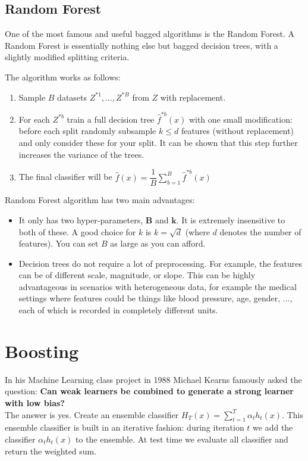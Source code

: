 \documentclass[twoside]{article}
\begin{document}
\subsection{Random Forest}

One of the most famous and useful bagged algorithms is the Random Forest. A Random Forest is essentially nothing else but bagged decision trees, with a slightly modified splitting criteria.

The algorithm works as follows:

\begin{enumerate}
    \item Sample $B$ datasets $Z^{*1},\ldots,Z^{*B}$  from $Z$ with replacement.
    \item For each $Z^{*b}$ train a full decision tree $\hat{f}^{*b}(x)$ with one small modification: before each split randomly subsample $k \leq d$ features (without replacement) and only consider these for your split.
    It can be shown that this step further increases the variance of the trees.
    \item The final classifier will be $\hat{f}(x) = \dfrac{1}{B} \sum_{b=1}^{B}\hat{f}^{*b}(x)$
\end{enumerate}

Random Forest algorithm has two main advantages:

\begin{itemize}
    \item It only has two hyper-parameters, $\mathbf{B}$ and $\mathbf{k}$. It is extremely insensitive to both of these. A good choice for $k$ is $k=\sqrt{d}$ (where $d$ denotes the number of features). You can set $B$ as large as you can afford.
    \item Decision trees do not require a lot of preprocessing. For example, the features can be of different scale, magnitude, or slope. This can be highly advantageous in scenarios with heterogeneous data, for example the medical settings where features could be things like blood pressure, age, gender, ..., each of which is recorded in completely different units.
\end{itemize}

\section{Boosting}
In his Machine Learning class project in 1988 Michael Kearns famously asked the question: \textbf{Can weak learners be combined to generate a strong learner with low bias?} \\ The answer is yes. Create an ensemble classifier $H_{T}(x) =\sum_{t=1}^{T} \alpha_{t} h_{t}(x)$. This ensemble classifier is built in an iterative fashion: during iteration $t$ we add the classifier $\alpha_{t} h_{t}(x)$ to the ensemble. At test time we evaluate all classifier and return the weighted sum.
\end{document}
